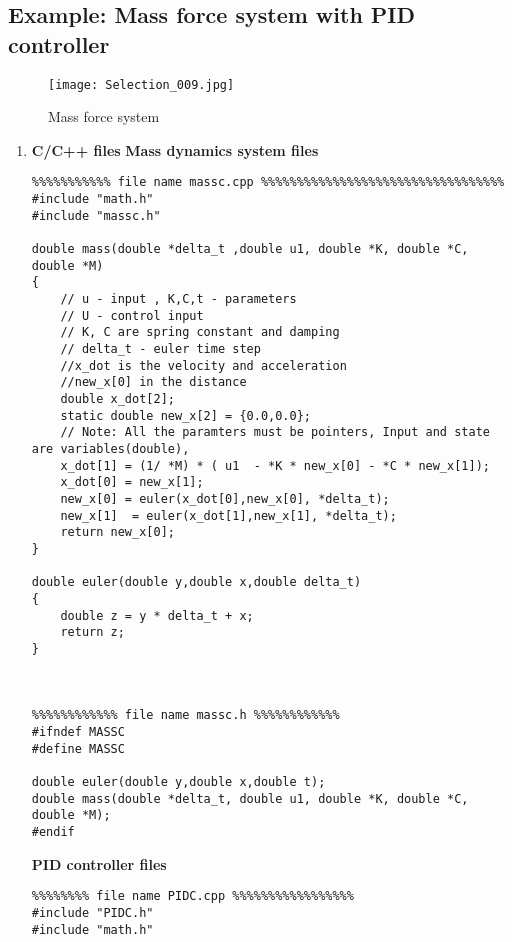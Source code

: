 \documentclass{article}
\begin{document}
\subsection{Example: Mass force system with PID controller}
\begin{figure}[H]
    \centering
    \texttt{[image: Selection\_009.jpg]}
    \caption{Mass force system}
    \label{fig:block_builder}
\end{figure}
\begin{enumerate}

\item \textbf{C/C++ files}
\textbf{Mass dynamics system files}

\begin{verbatim}
%%%%%%%%%%% file name massc.cpp %%%%%%%%%%%%%%%%%%%%%%%%%%%%%%%%%%
#include "math.h"
#include "massc.h"

double mass(double *delta_t ,double u1, double *K, double *C, double *M)
{   
    // u - input , K,C,t - parameters
    // U - control input
    // K, C are spring constant and damping
    // delta_t - euler time step
    //x_dot is the velocity and acceleration
    //new_x[0] in the distance
    double x_dot[2];
    static double new_x[2] = {0.0,0.0};
    // Note: All the paramters must be pointers, Input and state are variables(double),
    x_dot[1] = (1/ *M) * ( u1  - *K * new_x[0] - *C * new_x[1]);
    x_dot[0] = new_x[1];
    new_x[0] = euler(x_dot[0],new_x[0], *delta_t);
    new_x[1]  = euler(x_dot[1],new_x[1], *delta_t);
    return new_x[0];
}

double euler(double y,double x,double delta_t)
{
    double z = y * delta_t + x;
    return z;
}



%%%%%%%%%%%% file name massc.h %%%%%%%%%%%%
#ifndef MASSC
#define MASSC

double euler(double y,double x,double t);
double mass(double *delta_t, double u1, double *K, double *C, double *M);
#endif

\end{verbatim}
\textbf{PID controller files}
\begin{verbatim}
%%%%%%%% file name PIDC.cpp %%%%%%%%%%%%%%%%%
#include "PIDC.h"
#include "math.h"


\end{verbatim}
\end{enumerate}
\end{document}
